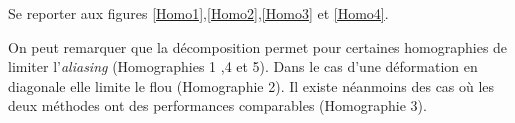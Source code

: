 

Se reporter aux figures \ref{Homo1},\ref{Homo2},\ref{Homo3} et \ref{Homo4}.

On peut remarquer que la décomposition permet pour certaines homographies de limiter l'\emph{aliasing} (Homographies 1 ,4 et 5). Dans le cas d'une déformation en diagonale elle limite le flou (Homographie 2). Il existe néanmoins des cas où les deux méthodes ont des performances comparables (Homographie 3).

\begin{figure}

\end{figure}
